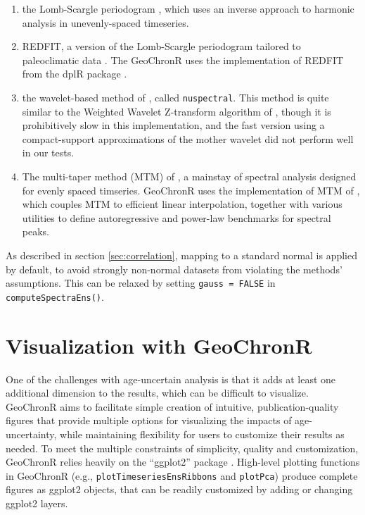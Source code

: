 \documentclass[gchron, manuscript]{copernicus}
\begin{document}
\begin{enumerate}
\def\labelenumi{\arabic{enumi}.}
\item
  the Lomb-Scargle periodogram \citep{VanderPlas_2018}, which uses an inverse approach to harmonic analysis in unevenly-spaced timeseries.
\item
  REDFIT, a version of the Lomb-Scargle periodogram tailored to paleoclimatic data \citep{SchulzMudelsee_02, Mudelsee_02, Mudelsee_NPG09}.
  The GeoChronR uses the implementation of REDFIT from the dplR package \citep{Bunn2008115}.
\item
  the wavelet-based method of \citet{Mathias_JSS04}, called \texttt{nuspectral}. This method is quite similar to the Weighted Wavelet Z-transform algorithm of \citet{Foster_AJ96}, though it is prohibitively slow in this implementation, and the fast version using a compact-support approximations of the mother wavelet did not perform well in our tests.
\item
  The multi-taper method (MTM) of \citet{thomson82}, a mainstay of spectral analysis \citep{Ghil02} designed for evenly spaced timseries.
  GeoChronR uses the implementation of MTM of \citet{astrochron}, which couples MTM to efficient linear interpolation, together with various utilities to define autoregressive and power-law benchmarks for spectral peaks.
\end{enumerate}

As described in section \ref{sec:correlation}, mapping to a standard normal is applied by default, to avoid strongly non-normal datasets from violating the methods' assumptions. This can be relaxed by setting \texttt{gauss\ =\ FALSE} in \texttt{computeSpectraEns()}.

\hypertarget{sec:visualization}{%
\section{Visualization with GeoChronR}\label{sec:visualization}}

One of the challenges with age-uncertain analysis is that it adds at least one additional dimension to the results, which can be difficult to visualize.
GeoChronR aims to facilitate simple creation of intuitive, publication-quality figures that provide multiple options for visualizing the impacts of age-uncertainty, while maintaining flexibility for users to customize their results as needed.
To meet the multiple constraints of simplicity, quality and customization, GeoChronR relies heavily on the ``ggplot2'' package \citep{ggplot2}.
High-level plotting functions in GeoChronR (e.g., \texttt{plotTimeseriesEnsRibbons} and \texttt{plotPca}) produce complete figures as ggplot2 objects, that can be readily customized by adding or changing ggplot2 layers.
\end{document}

